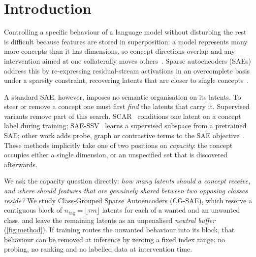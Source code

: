 \documentclass[11pt,a4paper]{article}
\theoremstyle{remark}
\newcommand{\ntag}{n_{\mathrm{tag}}}
\begin{document}
\section{Introduction}
\label{sec:intro}

Controlling a specific behaviour of a language model without disturbing the rest is difficult
because features are stored in superposition: a model represents many more concepts than it
has dimensions, so concept directions overlap and any intervention aimed at one collaterally
moves others~\citep{elhage2022toy}. Sparse autoencoders (SAEs) address this by re-expressing
residual-stream activations in an overcomplete basis under a sparsity constraint, recovering
latents that are closer to single concepts~\citep{bricken2023monosemanticity,cunningham2024sparse,templeton2024scaling,gao2024scaling}.

A standard SAE, however, imposes no semantic organisation on its latents. To steer or remove a
concept one must first \emph{find} the latents that carry it. Supervised variants remove part
of this search. SCAR~\citep{harle2024scar} conditions one latent on a concept label during
training; SAE-SSV~\citep{he2025saessv} learns a supervised subspace from a pretrained SAE;
other work adds probe, graph or contrastive terms to the SAE
objective~\citep{yeon2025gsae,kim2026saeparate}. These methods implicitly take one of two
positions on \emph{capacity}: the concept occupies either a single dimension, or an
unspecified set that is discovered afterwards.

We ask the capacity question directly: \emph{how many latents should a concept receive, and
where should features that are genuinely shared between two opposing classes reside?} We
study Class-Grouped Sparse Autoencoders (CG-SAE), which reserve a contiguous block of
$\ntag=\lfloor\tau m\rfloor$ latents for each of a wanted and an unwanted class, and leave the
remaining latents as an unpenalised \emph{neutral buffer} (\cref{fig:method}). If training
routes the unwanted behaviour into its block, that behaviour can be removed at inference by
zeroing a fixed index range: no probing, no ranking and no labelled data at intervention time.
\end{document}
